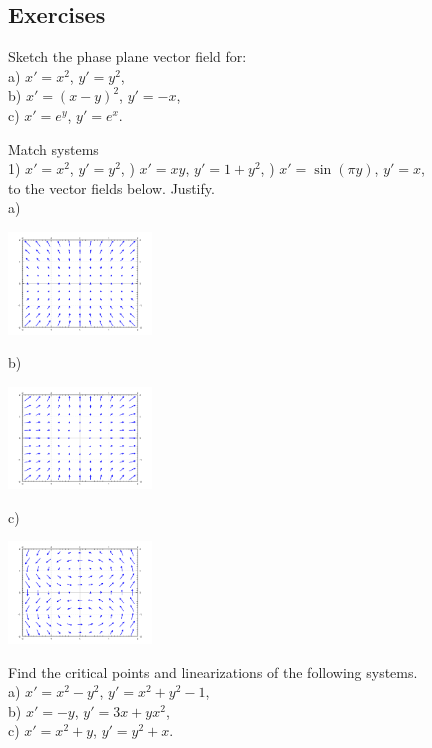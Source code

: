 \documentclass[12pt]{book}
\begin{document}
\subsection{Exercises}

\begin{exercise}
Sketch the phase plane vector field for:\\
a) $x'=x^2$, $y'=y^2$,\\
b) $x'=(x-y)^2$, $y'=-x$,\\
c) $x'=e^y$, $y'=e^x$.
\end{exercise}

\begin{exercise}
Match systems\\
1) $x'=x^2$, $y'=y^2$,
) $x'=xy$, $y'=1+y^2$,
) $x'=\sin(\pi y)$, $y'=x$,
\\
to the vector fields below.  Justify.
\\
a)
\parbox[c]{1.6in}{\includegraphics[width=1.5in]{figures/nlin-exer-xy-1py2}}
b)
\parbox[c]{1.6in}{\includegraphics[width=1.5in]{figures/nlin-exer-x2-y2}}
c)
\parbox[c]{1.6in}{\includegraphics[width=1.5in]{figures/nlin-exer-sinpiy-x}}
\end{exercise}


\begin{exercise}
Find the critical points and linearizations of the following systems.\\
a) $x'=x^2-y^2$, $y'=x^2+y^2-1$,\\
b) $x'=-y$, $y'=3x+yx^2$,\\
c) $x'=x^2+y$, $y'=y^2+x$.
\end{exercise}
\end{document}
